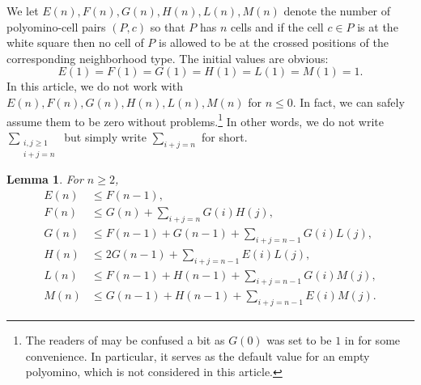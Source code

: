 \documentclass[a4paper,12pt]{article}
\newtheorem{lemma}{Lemma}
\begin{document}
We let $E(n),F(n),G(n),H(n),L(n),M(n)$ denote the number of polyomino-cell pairs $(P,c)$ so that $P$ has $n$ cells and if the cell $c\in P$ is at the white square then no cell of $P$ is allowed to be at the crossed positions of the corresponding neighborhood type.
The initial values are obvious:
\[
    E(1)=F(1)=G(1)=H(1)=L(1)=M(1)=1.
\]
In this article, we do not work with $E(n),F(n),G(n),H(n),L(n),M(n)$ for $n\le 0$. In fact, we can safely assume them to be zero without problems.\footnote{The readers of \cite{bui2025bounding} may be confused a bit as $G(0)$ was set to be $1$ in \cite{bui2025bounding} for some convenience. In particular, it serves as the default value for an empty polyomino, which is not considered in this article.} In other words, we do not write $\sum_{\substack{i,j\ge 1\\ i+j=n}}$ but simply write $\sum_{i+j=n}$ for short.
\begin{lemma} \label{lem:first}
For $n\ge 2$,
\begin{align*}
E(n) &\le F(n-1), \\
F(n) &\le G(n) + \sum_{i+j=n} G(i) H(j), \\
G(n) &\le F(n-1)+G(n-1)+\sum_{i+j=n-1} G(i) L(j), \\
H(n) &\le 2G(n-1)+ \sum_{i+j=n-1} E(i) L(j), \\
L(n) &\le F(n-1)+H(n-1)+ \sum_{i+j=n-1} G(i) M(j), \\
M(n) &\le G(n-1)+H(n-1)+ \sum_{i+j=n-1} E(i) M(j).
\end{align*}
\end{lemma}
\end{document}

